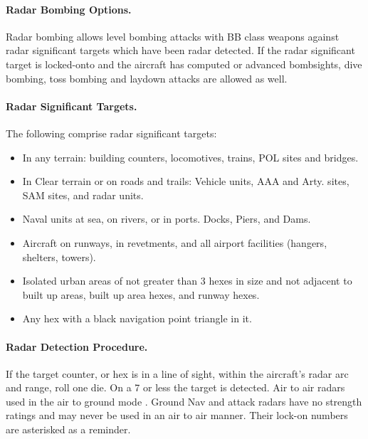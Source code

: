 \begin{advancedrules}
{\paragraph{Radar Bombing Options.} Radar bombing allows level bombing attacks with BB class weapons against radar significant targets which have been radar detected. If the radar significant target is locked-onto and the aircraft has computed or advanced bombsights, dive bombing, toss bombing and laydown attacks are allowed as well.

\paragraph{Radar Significant Targets.} The following comprise radar significant targets:

\begin{itemize}

    \item In any terrain: building counters, locomotives, trains, POL sites and bridges.

    \item In Clear terrain or on roads and trails: Vehicle units, AAA and Arty. sites, SAM sites, and radar units.

    \item Naval units at sea, on rivers, or in ports. Docks, Piers, and Dams.

    \item Aircraft on runways, in revetments, and all airport facilities (hangers, shelters, towers).

    \item Isolated urban areas of not greater than 3 hexes in size and not adjacent to built up areas, built up area hexes, and runway hexes.
    
    \item Any hex with a black navigation point triangle in it.

\end{itemize}

\paragraph{Radar Detection Procedure.} If the target counter, or hex is in a line of sight, within the aircraft's radar arc and  range, roll one die. On a 7 or less the target is detected. Air to air radars used in the air to ground mode . Ground Nav and attack radars have no strength ratings and may never be used in an air to air manner. Their lock-on numbers are asterisked as a reminder.

}
\end{advancedrules}
